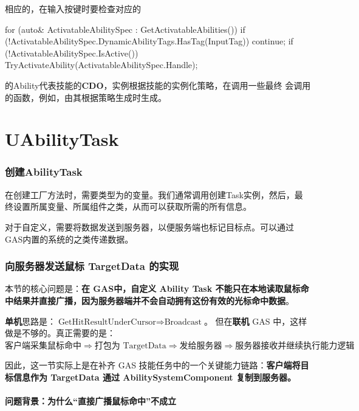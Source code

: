 \documentclass[10pt,CJKmath]{ctexart}
\begin{document}
相应的，在输入按键时要检查对应的
\begin{code}
for (auto& ActivatableAbilitySpec : GetActivatableAbilities())
{
	if (!ActivatableAbilitySpec.DynamicAbilityTags.HasTag(InputTag)) continue;
	if (!ActivatableAbilitySpec.IsActive())
	{
		TryActivateAbility(ActivatableAbilitySpec.Handle);
	}
}
\end{code}
的Ability代表技能的\textbf{CDO}，实例根据技能的实例化策略，在调用一些最终 会调用的函数，例如，由其根据策略生成时生成。

\part{UAbilityTask}
\section{创建AbilityTask}
在创建工厂方法时，需要类型为的变量。我们通常调用创建Task实例，然后，最终设置所属变量、所属组件之类，从而可以获取所需的所有信息。

对于自定义，需要将数据发送到服务器，以便服务端也标记目标点。可以通过GAS内置的系统的之类传递数据。


\section{向服务器发送鼠标 TargetData 的实现}


本节的核心问题是：\textbf{在  GAS中，自定义 Ability Task 不能只在本地读取鼠标命中结果并直接广播，因为服务器端并不会自动拥有这份有效的光标命中数据}。 

\textbf{单机}思路是：$
\text{GetHitResultUnderCursor} \Rightarrow \text{Broadcast}
$。
但在\textbf{联机} GAS 中，这样做是不够的。真正需要的是：
$
\text{客户端采集鼠标命中} \Rightarrow \text{打包为 TargetData} \Rightarrow \text{发给服务器} \Rightarrow \text{服务器接收并继续执行能力逻辑}
$

因此，这一节实际上是在补齐 GAS 技能任务中的一个关键能力链路：\textbf{客户端将目标信息作为 TargetData 通过 AbilitySystemComponent 复制到服务器。}

\subsection{问题背景：为什么“直接广播鼠标命中”不成立}
\end{document}
